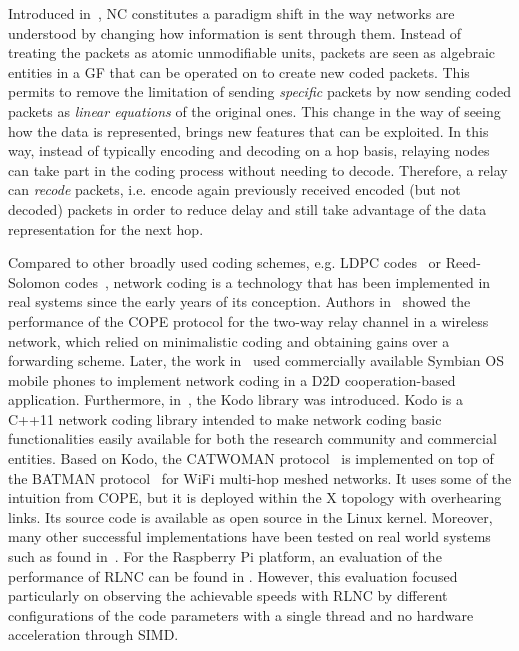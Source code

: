 Introduced in~\cite{ahlswede2000network}, \ac{NC}
constitutes a paradigm shift in the way networks are understood
by changing how information is sent through them.
Instead of treating the packets as atomic
unmodifiable units, packets are seen as algebraic entities in a \ac{GF}
that can be operated on to create new coded packets. This permits to
remove the limitation of sending \textit{specific} packets by now sending
coded packets as \textit{linear equations} of the original ones. This
change in the way of seeing how the data is represented, brings new
features that can be exploited. In this way, instead of typically encoding
and decoding on a hop basis, relaying nodes can take part in the
coding process without needing to decode. Therefore, a relay can
\textit{recode} packets, i.e. encode again previously received encoded
(but not decoded) packets in order to reduce delay and still
take advantage of the data representation for the next hop.

Compared to other broadly used coding schemes, e.g. \ac{LDPC}
codes~\cite{gallager1962low} or Reed-Solomon
codes~\cite{reed1960polynomial}, network coding is a technology that
has been implemented in real systems since the early years of its
conception. Authors in~\cite{katti2008xors} showed the
performance of the COPE protocol for the two-way relay channel
in a wireless network, which relied on minimalistic coding and obtaining
gains over a forwarding scheme. Later, the work in~\cite{pedersen2008implementation} used commercially available
Symbian OS mobile phones to implement network coding in a
\ac{D2D} cooperation-based application. Furthermore,
in~\cite{kodo2011pedersen}, the Kodo library was introduced. Kodo is
a C++11 network coding library intended to make network coding
basic functionalities easily available for both the research community
and commercial entities. Based on Kodo, the CATWOMAN
protocol~\cite{hundeboll2012catwoman} is implemented on top of the
BATMAN protocol~\cite{johnson2008simple} for WiFi multi-hop meshed
networks. It uses some of the intuition from COPE, but it is deployed
within the X topology with overhearing links. Its source code is available
as open source in the Linux kernel. Moreover, many other successful
implementations have been tested on real world systems such as
found in~\cite{pahlevani2013playncool,krigslund2013core,
paramanathan2013leanandmean}. For the Raspberry Pi platform, an evaluation
of the performance of \ac{RLNC} can be found in \cite{paramanathan2014sharing}.
However, this evaluation focused particularly on observing the achievable
speeds with \ac{RLNC} \cite{ho2006random} by different configurations of
the code parameters with a single thread and no hardware acceleration through
\ac{SIMD}.

